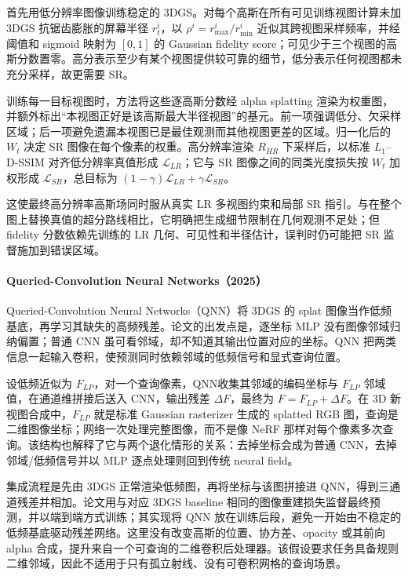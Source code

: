 首先用低分辨率图像训练稳定的 3DGS。对每个高斯在所有可见训练视图计算未加 3DGS 抗锯齿膨胀的屏幕半径 $r_t^i$，以 $\rho^i=r^i_{\max}/r^i_{\min}$ 近似其跨视图采样频率，并经阈值和 sigmoid 映射为 $[0,1]$ 的 Gaussian fidelity score；可见少于三个视图的高斯分数置零。高分表示至少有某个视图提供较可靠的细节，低分表示任何视图都未充分采样，故更需要 SR。

训练每一目标视图时，方法将这些逐高斯分数经 alpha splatting 渲染为权重图，并额外标出“本视图正好是该高斯最大半径视图”的基元。前一项强调低分、欠采样区域；后一项避免遗漏本视图已是最佳观测而其他视图更差的区域。归一化后的 $W_t$ 决定 SR 图像在每个像素的权重。高分辨率渲染 $R_{HR}$ 下采样后，以标准 $L_1$--D-SSIM 对齐低分辨率真值形成 $\mathcal L_{LR}$；它与 SR 图像之间的同类光度损失按 $W_t$ 加权形成 $\mathcal L_{SR}$，总目标为 $(1-\gamma)\mathcal L_{LR}+\gamma\mathcal L_{SR}$。

这使最终高分辨率高斯场同时服从真实 LR 多视图约束和局部 SR 指引。与在整个图上替换真值的超分路线相比，它明确把生成细节限制在几何观测不足处；但 fidelity 分数依赖先训练的 LR 几何、可见性和半径估计，误判时仍可能把 SR 监督施加到错误区域。

\paragraph{Queried-Convolution Neural Networks（2025）\cite{2512_12898}}
Queried-Convolution Neural Networks（QNN）将 3DGS 的 splat 图像当作低频基底，再学习其缺失的高频残差。论文的出发点是，逐坐标 MLP 没有图像邻域归纳偏置；普通 CNN 虽可看邻域，却不知道其输出位置对应的坐标。QNN 把两类信息一起输入卷积，使预测同时依赖邻域的低频信号和显式查询位置。

设低频近似为 $F_{LP}$，对一个查询像素，QNN收集其邻域的编码坐标与 $F_{LP}$ 邻域值，在通道维拼接后送入 CNN，输出残差 $\Delta F$，最终为 $F=F_{LP}+\Delta F$。在 3D 新视图合成中，$F_{LP}$ 就是标准 Gaussian rasterizer 生成的 splatted RGB 图，查询是二维图像坐标；网络一次处理完整图像，而不是像 NeRF 那样对每个像素多次查询。该结构也解释了它与两个退化情形的关系：去掉坐标会成为普通 CNN，去掉邻域/低频信号并以 MLP 逐点处理则回到传统 neural field。

集成流程是先由 3DGS 正常渲染低频图，再将坐标与该图拼接进 QNN，得到三通道残差并相加。论文用与对应 3DGS baseline 相同的图像重建损失监督最终预测，并以端到端方式训练；其实现将 QNN 放在训练后段，避免一开始由不稳定的低频基底驱动残差网络。这里没有改变高斯的位置、协方差、opacity 或其前向 alpha 合成，提升来自一个可查询的二维卷积后处理器。该假设要求任务具备规则二维邻域，因此不适用于只有孤立射线、没有可卷积网格的查询场景。

